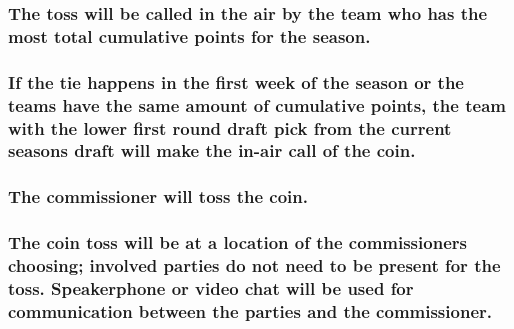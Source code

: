 \documentclass[
]{book}
\begin{document}
\hypertarget{the-toss-will-be-called-in-the-air-by-the-team-who-has-the-most-total-cumulative-points-for-the-season.}{%
\subsubsection{The toss will be called in the air by the team who has the most total cumulative points for the season.}\label{the-toss-will-be-called-in-the-air-by-the-team-who-has-the-most-total-cumulative-points-for-the-season.}}

\hypertarget{if-the-tie-happens-in-the-first-week-of-the-season-or-the-teams-have-the-same-amount-of-cumulative-points-the-team-with-the-lower-first-round-draft-pick-from-the-current-seasons-draft-will-make-the-in-air-call-of-the-coin.}{%
\subsubsection{If the tie happens in the first week of the season or the teams have the same amount of cumulative points, the team with the lower first round draft pick from the current seasons draft will make the in-air call of the coin.}\label{if-the-tie-happens-in-the-first-week-of-the-season-or-the-teams-have-the-same-amount-of-cumulative-points-the-team-with-the-lower-first-round-draft-pick-from-the-current-seasons-draft-will-make-the-in-air-call-of-the-coin.}}

\hypertarget{the-commissioner-will-toss-the-coin.}{%
\subsubsection{The commissioner will toss the coin.}\label{the-commissioner-will-toss-the-coin.}}

\hypertarget{the-coin-toss-will-be-at-a-location-of-the-commissioners-choosing-involved-parties-do-not-need-to-be-present-for-the-toss.-speakerphone-or-video-chat-will-be-used-for-communication-between-the-parties-and-the-commissioner.}{%
\subsubsection{The coin toss will be at a location of the commissioners choosing; involved parties do not need to be present for the toss. Speakerphone or video chat will be used for communication between the parties and the commissioner.}\label{the-coin-toss-will-be-at-a-location-of-the-commissioners-choosing-involved-parties-do-not-need-to-be-present-for-the-toss.-speakerphone-or-video-chat-will-be-used-for-communication-between-the-parties-and-the-commissioner.}}
\end{document}
